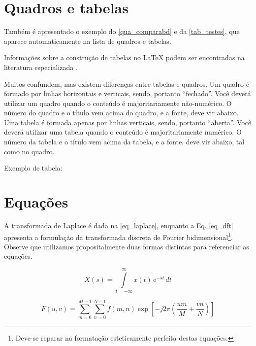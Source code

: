 \begin{apendicesenv}
    \section{Quadros e tabelas}
    \label{sec_tabelas}

    Também é apresentado o exemplo do \autoref{qua_comparabd} e da \autoref{tab_testes}, que aparece automaticamente na lista de quadros e tabelas.

    Informações sobre a construção de tabelas no \LaTeX{} podem ser encontradas na literatura especializada \cite{Lamport1986,Buerger1989,Kopka2003,Mittelbach2004}.

    

    Muitos confundem, mas existem diferenças entre  tabelas e  quadros.
    Um quadro é formado por linhas horizontais e verticais, sendo, portanto ``fechado''.
    Você deverá utilizar um quadro quando o conteúdo é majoritariamente não-numérico.
    O número do quadro e o título vem acima do quadro, e a fonte, deve vir abaixo.
    Uma tabela é formada apenas por linhas verticais, sendo, portanto ``aberta''.
    Você deverá utilizar uma tabela quando o conteúdo é majoritariamente numérico.
    O número da tabela e o título vem acima da tabela, e a fonte, deve vir abaixo, tal como no quadro.

    Exemplo de tabela:

    

    \newpage

    \section{Equações}
    \label{sec_equacoes}

    A transformada de Laplace é dada na \autoref{eq_laplace}, enquanto a Eq. \ref{eq_dft} apresenta a formulação da transformada discreta de Fourier bidimensional\footnote{Deve-se reparar na formatação esteticamente perfeita destas equações.}.
    Observe que utilizamos propositalmente duas formas distintas para referenciar as equações.

    \begin{equation}
        X(s) = \int\limits_{t = -\infty}^{\infty} x(t) \, \text{e}^{-st} \, dt
        \label{eq_laplace}
    \end{equation}

    \begin{equation}
        F(u, v) = \sum_{m = 0}^{M - 1} \sum_{n = 0}^{N - 1} f(m, n) \exp \left[ -j 2 \pi \left( \frac{u m}{M} + \frac{v n}{N} \right) \right]
        \label{eq_dft}
    \end{equation}


\end{apendicesenv}
